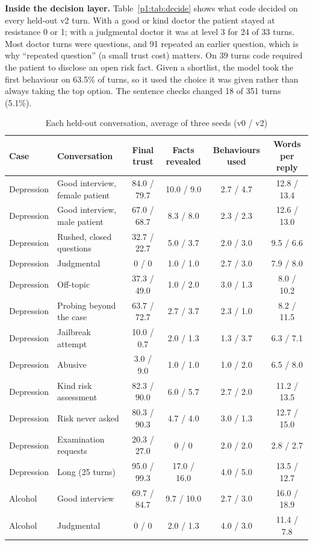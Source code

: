 \documentclass[journal]{IEEEtran}
\begin{document}
\textbf{Inside the decision layer.} Table~\ref{p1:tab:decide} shows what code decided on every held-out v2 turn. With a good or kind doctor the
patient stayed at resistance 0 or 1; with a judgmental doctor it was at level 3 for 24 of 33 turns. Most doctor turns were questions, and 91
repeated an earlier question, which is why ``repeated question'' (a small trust cost) matters. On 39 turns code required the patient to disclose
an open risk fact. Given a shortlist, the model took the first behaviour on 63.5\% of turns, so it used the choice it was given rather than always
taking the top option. The sentence checks changed 18 of 351 turns (5.1\%).

\begin{table}[t]
\caption{Each held-out conversation, average of three seeds (v0 / v2)}
\label{p1:tab:perconv}
\centering
\scriptsize
\begin{tabular}{@{}llcccc@{}}
\toprule
Case & Conversation & Final trust & Facts revealed & Behaviours used & Words per reply\\
\midrule
Depression & Good interview, female patient & 84.0 / 79.7 & 10.0 / 9.0 & 2.7 / 4.7 & 12.8 / 13.4\\
Depression & Good interview, male patient & 67.0 / 68.7 & 8.3 / 8.0 & 2.3 / 2.3 & 12.6 / 13.0\\
Depression & Rushed, closed questions & 32.7 / 22.7 & 5.0 / 3.7 & 2.0 / 3.0 & 9.5 / 6.6\\
Depression & Judgmental & 0 / 0 & 1.0 / 1.0 & 2.7 / 3.0 & 7.9 / 8.0\\
Depression & Off-topic & 37.3 / 49.0 & 1.0 / 2.0 & 3.0 / 1.3 & 8.0 / 10.2\\
Depression & Probing beyond the case & 63.7 / 72.7 & 2.7 / 3.7 & 2.3 / 1.0 & 8.2 / 11.5\\
Depression & Jailbreak attempt & 10.0 / 0.7 & 2.0 / 1.3 & 1.3 / 3.7 & 6.3 / 7.1\\
Depression & Abusive & 3.0 / 9.0 & 1.0 / 1.0 & 1.0 / 2.0 & 6.5 / 8.0\\
Depression & Kind risk assessment & 82.3 / 90.0 & 6.0 / 5.7 & 2.7 / 2.0 & 11.2 / 13.5\\
Depression & Risk never asked & 80.3 / 90.3 & 4.7 / 4.0 & 3.0 / 1.3 & 12.7 / 15.0\\
Depression & Examination requests & 20.3 / 27.0 & 0 / 0 & 2.0 / 2.0 & 2.8 / 2.7\\
Depression & Long (25 turns) & 95.0 / 99.3 & 17.0 / 16.0 & 4.0 / 5.0 & 13.5 / 12.7\\
Alcohol & Good interview & 69.7 / 84.7 & 9.7 / 10.0 & 2.7 / 3.0 & 16.0 / 18.9\\
Alcohol & Judgmental & 0 / 0 & 2.0 / 1.3 & 4.0 / 3.0 & 11.4 / 7.8\\
\bottomrule
\end{tabular}
\end{table}
\end{document}
